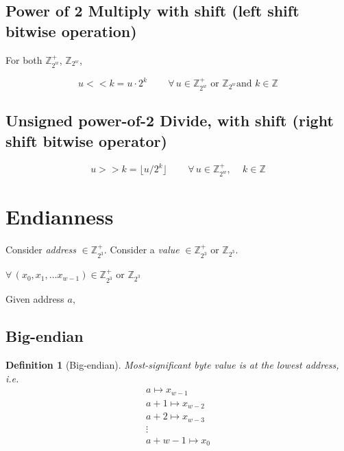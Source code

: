 \documentclass[10pt]{amsart}
\newtheorem{definition}{Definition}
\begin{document}
\begin{multicols*}{2}
\subsection{Power of 2 Multiply with shift (left shift bitwise operation) }

For both $\mathbb{Z}^+_{2^w}$, $\mathbb{Z}_{2^w}$, 

\begin{equation}
 u << k = u \cdot 2^k \qquad \, \forall \, u \in \mathbb{Z}^+_{2^w} \text{ or } \mathbb{Z}_{2^w} \text{and } k \in \mathbb{Z}
\end{equation}

\subsection{Unsigned power-of-2 Divide, with shift (right shift bitwise operator)}

\begin{equation}
u >> k = \lfloor u / 2^k \rfloor \qquad \, \forall \, u \in \mathbb{Z}^+_{2^w}, \quad \, k \in \mathbb{Z}  
\end{equation}

\section{Endianness} 

Consider \emph{address} $\in \mathbb{Z}^+_{2^3}$.  Consider a \emph{value} $\in \mathbb{Z}^+_{2^3}$ or $\mathbb{Z}_{2^3}$. 

$\forall \, (x_0, x_1, \dots x_{w-1}) \in \mathbb{Z}^+_{2^3} \text{ or } \mathbb{Z}_{2^3}$

Given address $a$, 

\subsection{Big-endian}

\begin{definition}[Big-endian]
	Most-significant byte value is at the lowest address, i.e. 
	\begin{equation}
	\begin{gathered}
	a \mapsto x_{w-1} \\
	a+1 \mapsto x_{w-2} \\ 
	a+2 \mapsto x_{w-3} \\ 
	\vdots \\
	a+w - 1 \mapsto x_0 
	\end{gathered}
	\end{equation}
	\end{definition} 


\end{multicols*}
\end{document}

